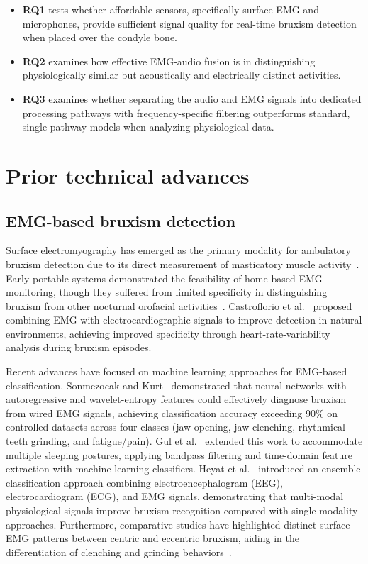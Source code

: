 \documentclass[pdflatex,sn-nature,iicol]{sn-jnl}
\begin{document}
\begin{itemize}
    \item \textbf{RQ1} tests whether affordable sensors, specifically surface EMG and microphones, provide sufficient signal quality for real-time bruxism detection when placed over the condyle bone.
    \item \textbf{RQ2} examines how effective EMG-audio fusion is in distinguishing physiologically similar but acoustically and electrically distinct activities.
    \item \textbf{RQ3} examines whether separating the audio and EMG signals into dedicated processing pathways with frequency-specific filtering outperforms standard, single-pathway models when analyzing physiological data.
\end{itemize}


\section{Prior technical advances}

\subsection{EMG-based bruxism detection}

Surface electromyography has emerged as the primary modality for ambulatory bruxism detection due to its direct measurement of masticatory muscle activity~\cite{raez2006techniques}. Early portable systems demonstrated the feasibility of home-based EMG monitoring, though they suffered from limited specificity in distinguishing bruxism from other nocturnal orofacial activities~\cite{stuginski2016detection}. Castroflorio et al.~\cite{castroflorio2013use} proposed combining EMG with electrocardiographic signals to improve detection in natural environments, achieving improved specificity through heart-rate-variability analysis during bruxism episodes.

Recent advances have focused on machine learning approaches for EMG-based classification. Sonmezocak and Kurt~\cite{sonmezocak2021detection} demonstrated that neural networks with autoregressive and wavelet-entropy features could effectively diagnose bruxism from wired EMG signals, achieving classification accuracy exceeding 90\% on controlled datasets across four classes (jaw opening, jaw clenching, rhythmical teeth grinding, and fatigue/pain). Gul et al.~\cite{gul2024advanced} extended this work to accommodate multiple sleeping postures, applying bandpass filtering and time-domain feature extraction with machine learning classifiers. Heyat et al.~\cite{heyat2020computational} introduced an ensemble classification approach combining electroencephalogram (EEG), electrocardiogram (ECG), and EMG signals, demonstrating that multi-modal physiological signals improve bruxism recognition compared with single-modality approaches. Furthermore, comparative studies have highlighted distinct surface EMG patterns between centric and eccentric bruxism, aiding in the differentiation of clenching and grinding behaviors~\cite{lan2022comparative}.
\end{document}

